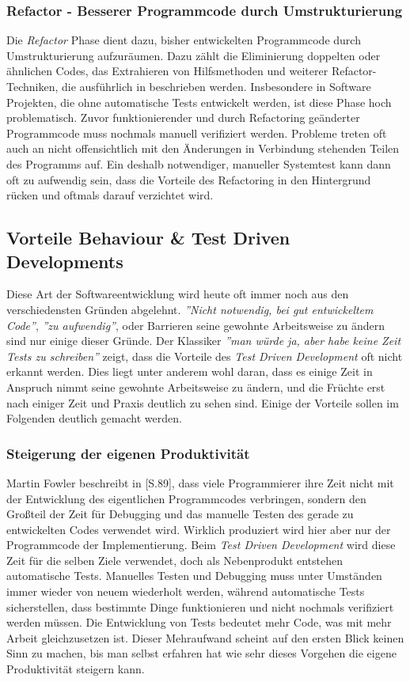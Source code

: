 \subsubsection{Refactor - Besserer Programmcode durch
  Umstrukturierung}
Die \textit{Refactor} Phase dient dazu, bisher entwickelten
Programmcode durch Umstrukturierung aufzuräumen. Dazu zählt die
Eliminierung doppelten oder ähnlichen Codes, das Extrahieren von
Hilfsmethoden und weiterer Refactor-Techniken, die ausführlich in
\cite{Fowler1999} beschrieben werden. Insbesondere in Software
Projekten, die ohne automatische Tests entwickelt werden, ist diese
Phase hoch problematisch. Zuvor funktionierender und durch Refactoring
geänderter Programmcode muss nochmals manuell verifiziert
werden. Probleme treten oft auch an nicht offensichtlich mit den
Änderungen in Verbindung stehenden Teilen des Programms auf. Ein
deshalb notwendiger, manueller Systemtest kann dann oft zu aufwendig
sein, dass die Vorteile des Refactoring in den Hintergrund rücken und
oftmals darauf verzichtet wird.

\subsection{Vorteile Behaviour \& Test Driven Developments}
Diese Art der Softwareentwicklung wird heute oft immer noch aus den
verschiedensten Gründen abgelehnt. \textit{''Nicht notwendig, bei gut
  entwickeltem Code''}, \textit{''zu aufwendig''}, oder Barrieren
seine gewohnte Arbeitsweise zu ändern sind nur einige dieser
Gründe. Der Klassiker \textit{''man würde ja, aber habe keine Zeit
  Tests zu schreiben''} zeigt, dass die Vorteile des \textit{Test
  Driven Development} oft nicht erkannt werden. Dies liegt unter
anderem wohl daran, dass es einige Zeit in Anspruch nimmt seine
gewohnte Arbeitsweise zu ändern, und die Früchte erst nach einiger
Zeit und Praxis deutlich zu sehen sind. Einige der Vorteile sollen im
Folgenden deutlich gemacht werden.

\subsubsection{Steigerung der eigenen Produktivität}
Martin Fowler beschreibt in \cite{Fowler1999}[S.89], dass viele
Programmierer ihre Zeit nicht mit der Entwicklung des eigentlichen
Programmcodes verbringen, sondern den Großteil der Zeit für Debugging
und das manuelle Testen des gerade zu entwickelten Codes verwendet
wird. Wirklich produziert wird hier aber nur der Programmcode der
Implementierung. Beim \textit{Test Driven Development} wird diese Zeit
für die selben Ziele verwendet, doch als Nebenprodukt entstehen
automatische Tests. Manuelles Testen und Debugging muss unter
Umständen immer wieder von neuem wiederholt werden, während
automatische Tests sicherstellen, dass bestimmte Dinge funktionieren
und nicht nochmals verifiziert werden müssen. Die Entwicklung von
Tests bedeutet mehr Code, was mit mehr Arbeit gleichzusetzen
ist. Dieser Mehraufwand scheint auf den ersten Blick keinen Sinn zu
machen, bis man selbst erfahren hat wie sehr dieses Vorgehen die
eigene Produktivität steigern kann.

